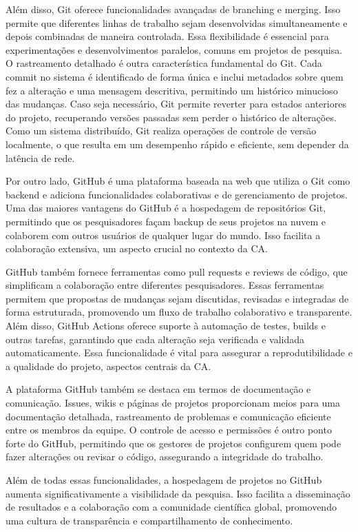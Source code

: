 \documentclass[
  a4paper,
]{article}
\begin{document}
Além disso, Git oferece funcionalidades avançadas de branching e
merging. Isso permite que diferentes linhas de trabalho sejam
desenvolvidas simultaneamente e depois combinadas de maneira controlada.
Essa flexibilidade é essencial para experimentações e desenvolvimentos
paralelos, comuns em projetos de pesquisa. O rastreamento detalhado é
outra característica fundamental do Git. Cada commit no sistema é
identificado de forma única e inclui metadados sobre quem fez a
alteração e uma mensagem descritiva, permitindo um histórico minucioso
das mudanças. Caso seja necessário, Git permite reverter para estados
anteriores do projeto, recuperando versões passadas sem perder o
histórico de alterações. Como um sistema distribuído, Git realiza
operações de controle de versão localmente, o que resulta em um
desempenho rápido e eficiente, sem depender da latência de rede.

Por outro lado, GitHub é uma plataforma baseada na web que utiliza o Git
como backend e adiciona funcionalidades colaborativas e de gerenciamento
de projetos. Uma das maiores vantagens do GitHub é a hospedagem de
repositórios Git, permitindo que os pesquisadores façam backup de seus
projetos na nuvem e colaborem com outros usuários de qualquer lugar do
mundo. Isso facilita a colaboração extensiva, um aspecto crucial no
contexto da CA.

GitHub também fornece ferramentas como pull requests e reviews de
código, que simplificam a colaboração entre diferentes pesquisadores.
Essas ferramentas permitem que propostas de mudanças sejam discutidas,
revisadas e integradas de forma estruturada, promovendo um fluxo de
trabalho colaborativo e transparente. Além disso, GitHub Actions oferece
suporte à automação de testes, builds e outras tarefas, garantindo que
cada alteração seja verificada e validada automaticamente. Essa
funcionalidade é vital para assegurar a reprodutibilidade e a qualidade
do projeto, aspectos centrais da CA.

A plataforma GitHub também se destaca em termos de documentação e
comunicação. Issues, wikis e páginas de projetos proporcionam meios para
uma documentação detalhada, rastreamento de problemas e comunicação
eficiente entre os membros da equipe. O controle de acesso e permissões
é outro ponto forte do GitHub, permitindo que os gestores de projetos
configurem quem pode fazer alterações ou revisar o código, assegurando a
integridade do trabalho.

Além de todas essas funcionalidades, a hospedagem de projetos no GitHub
aumenta significativamente a visibilidade da pesquisa. Isso facilita a
disseminação de resultados e a colaboração com a comunidade científica
global, promovendo uma cultura de transparência e compartilhamento de
conhecimento.
\end{document}

